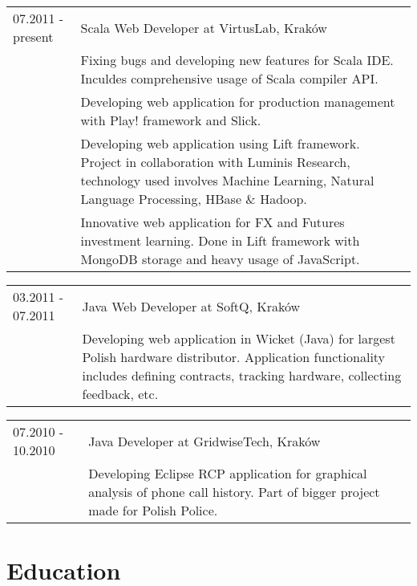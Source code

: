 \documentclass[a4paper,pdftex]{article}
\renewenvironment{itemize}{
  \begin{list}{}{
    \setlength{\leftmargin}{1.5em}
  }
}{
  \end{list}
}
\begin{document}
\begin{itemize}
 \item 
  \begin{tabular}{p{}p{}}
   07.2011 - present & Scala Web Developer at VirtusLab, Kraków \\
			& Fixing bugs and developing new features for Scala IDE. Inculdes comprehensive usage of Scala compiler API. \\
			& Developing web application for production management with Play! framework and Slick. \\
			& Developing web application using Lift framework. Project in collaboration with Luminis Research, technology used involves Machine Learning, Natural Language Processing, HBase \& Hadoop. \\
			& Innovative web application for FX and Futures investment learning. Done in Lift framework with MongoDB storage and heavy usage of JavaScript.
  \end{tabular}
 \item 
  \begin{tabular}{p{}p{}}
   03.2011 - 07.2011 & Java Web Developer at SoftQ, Kraków \\
   			& Developing web application in Wicket (Java) for largest Polish hardware distributor. Application functionality includes defining contracts, tracking hardware, collecting feedback, etc.
  \end{tabular}
 \item 
  \begin{tabular}{p{}p{}}
   07.2010 - 10.2010  & Java Developer at GridwiseTech, Kraków \\
   			& Developing Eclipse RCP application for graphical analysis of phone call history. Part of bigger project made for Polish Police. 
  \end{tabular}
\end{itemize}

\section*{Education}
\end{document}
